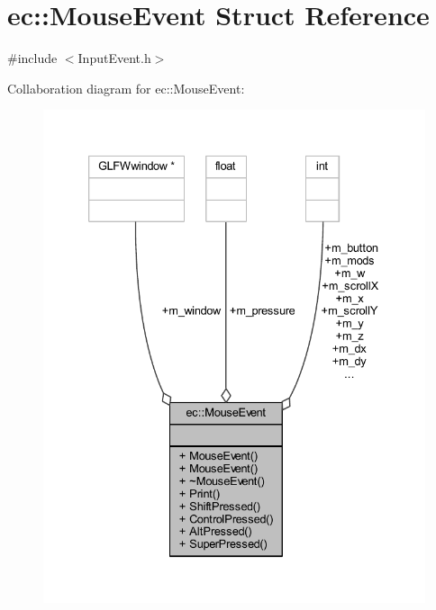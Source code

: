 \hypertarget{structec_1_1_mouse_event}{}\section{ec\+:\+:Mouse\+Event Struct Reference}
\label{structec_1_1_mouse_event}


{\ttfamily \#include $<$Input\+Event.\+h$>$}



Collaboration diagram for ec\+:\+:Mouse\+Event\+:
\nopagebreak
\begin{figure}[H]
\begin{center}
\leavevmode
\includegraphics[width=333pt]{structec_1_1_mouse_event__coll__graph}
\end{center}
\end{figure}
